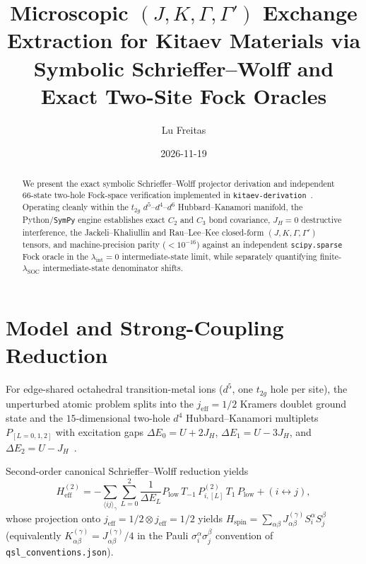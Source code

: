 \documentclass[11pt,a4paper]{article}
\title{\textbf{Microscopic $(J, K, \Gamma, \Gamma')$ Exchange Extraction for Kitaev Materials via Symbolic Schrieffer--Wolff and Exact Two-Site Fock Oracles}}
\author{Lu Freitas}
\date{2026-11-19}
\begin{document}
\maketitle

\begin{abstract}
We present the exact symbolic Schrieffer--Wolff projector derivation and independent $66$-state two-hole Fock-space verification implemented in \texttt{kitaev-derivation}~\cite{Jackeli2009,RauLeeKee2014,Winter2016}. Operating cleanly within the $t_{2g}$ $d^5$--$d^4$--$d^6$ Hubbard--Kanamori manifold, the Python/\texttt{SymPy} engine establishes exact $C_2$ and $C_3$ bond covariance, $J_H=0$ destructive interference, the Jackeli--Khaliullin and Rau--Lee--Kee closed-form $(J, K, \Gamma, \Gamma')$ tensors, and machine-precision parity ($<10^{-16}$) against an independent \texttt{scipy.sparse} Fock oracle in the $\lambda_{\mathrm{int}}=0$ intermediate-state limit, while separately quantifying finite-$\lambda_{\mathrm{SOC}}$ intermediate-state denominator shifts.
\end{abstract}

\section{Model and Strong-Coupling Reduction}
For edge-shared octahedral transition-metal ions ($d^5$, one $t_{2g}$ hole per site), the unperturbed atomic problem splits into the $j_{\mathrm{eff}}=1/2$ Kramers doublet ground state and the $15$-dimensional two-hole $d^4$ Hubbard--Kanamori multiplets $P_{[L=0,1,2]}$ with excitation gaps $\Delta E_0 = U + 2J_H$, $\Delta E_1 = U - 3J_H$, and $\Delta E_2 = U - J_H$~\cite{Jackeli2009,RauLeeKee2014}.

Second-order canonical Schrieffer--Wolff reduction yields
\begin{equation}
  H_{\mathrm{eff}}^{(2)} = -\sum_{\langle ij\rangle_\gamma}\sum_{L=0}^{2}\frac{1}{\Delta E_L} P_{\mathrm{low}}\,T_{-1}\,P_{i,[L]}^{(2)}\,T_1\,P_{\mathrm{low}} + (i \leftrightarrow j),
\end{equation}
whose projection onto $j_{\mathrm{eff}}=1/2 \otimes j_{\mathrm{eff}}=1/2$ yields $H_{\mathrm{spin}} = \sum_{\alpha\beta} J_{\alpha\beta}^{(\gamma)} S_i^\alpha S_j^\beta$ (equivalently $K_{\alpha\beta}^{(\gamma)} = J_{\alpha\beta}^{(\gamma)}/4$ in the Pauli $\sigma_i^\alpha\sigma_j^\beta$ convention of \texttt{qsl\_conventions.json}).
\end{document}
